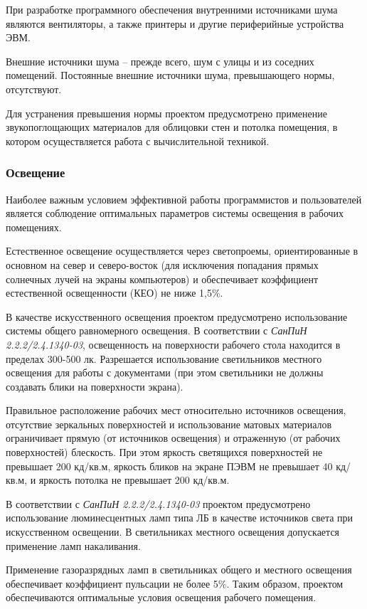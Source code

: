При разработке программного обеспечения внутренними источниками шума являются вентиляторы, а также принтеры и другие периферийные
устройства ЭВМ. 

Внешние источники шума -- прежде всего, шум с улицы и из соседних помещений. Постоянные внешние источники шума, превышающего нормы,
отсутствуют.

Для устранения превышения нормы проектом предусмотрено применение звукопоглощающих материалов для облицовки стен и потолка
помещения, в котором осуществляется работа с вычислительной техникой.


\subsubsection{Освещение}
Наиболее важным условием эффективной работы программистов и пользователей является соблюдение оптимальных параметров системы
освещения в рабочих помещениях.

Естественное освещение осуществляется через светопроемы, ориентированные в основном на север и северо-восток (для исключения
        попадания прямых солнечных лучей на экраны компьютеров) и обеспечивает коэффициент естественной освещенности (КЕО) не ниже
1,5\%.

В качестве искусственного освещения проектом предусмотрено использование системы общего равномерного освещения. В соответствии с
\textit{СанПиН 2.2.2/2.4.1340-03},  освещенность на поверхности рабочего стола находится в пределах 300-500 лк. Разрешается использование
светильников местного освещения для работы с документами (при этом светильники не должны создавать блики на поверхности экрана).

Правильное расположение рабочих мест относительно источников освещения, отсутствие зеркальных поверхностей и использование матовых
материалов ограничивает прямую (от источников освещения) и отраженную (от рабочих поверхностей) блескость. При этом яркость
светящихся поверхностей не превышает 200 кд/кв.м, яркость бликов на экране ПЭВМ не превышает 40 кд/кв.м, и яркость потолка не
превышает 200 кд/кв.м.

В соответствии с \textit{СанПиН 2.2.2/2.4.1340-03}  проектом предусмотрено использование люминесцентных ламп типа ЛБ в качестве источников
света при искусственном освещении. В светильниках местного освещения допускается применение ламп накаливания.

Применение газоразрядных ламп в светильниках общего и местного освещения обеспечивает коэффициент пульсации не более 5\%.
Таким образом, проектом обеспечиваются оптимальные условия освещения рабочего помещения.

